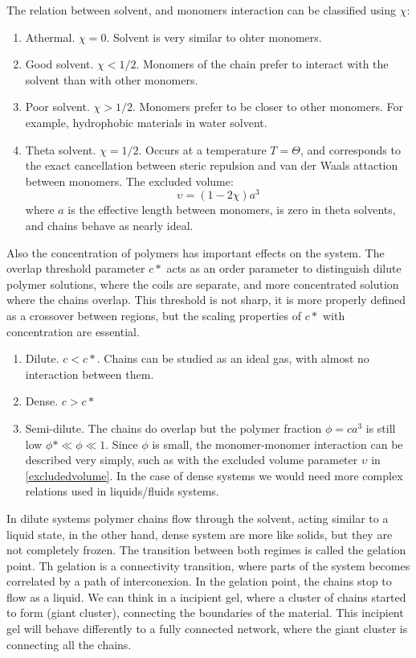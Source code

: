 The relation between solvent, and monomers interaction can be classified using
$\chi$:
\begin{enumerate}
  \item Athermal. $\chi=0$. Solvent is very similar to ohter monomers.
  \item Good solvent. $\chi<1/2$. Monomers of the chain prefer to interact with
  the solvent than with other monomers.
  \item Poor solvent. $\chi>1/2$. Monomers prefer to be closer to other
  monomers. For example, hydrophobic materials in water solvent.
  \item Theta solvent. $\chi=1/2$. Occurs at a temperature $T=\Theta$, and
  corresponds to the exact cancellation between steric repulsion and van der
  Waals attaction between monomers. The excluded volume:
  \begin{equation}\label{excludedvolume}
  \upsilon=(1-2\chi)a^3
  \end{equation}
  where $a$ is the effective length between monomers, is zero in theta solvents,
  and chains behave as nearly ideal.\citep{gennes_scaling_1979}
\end{enumerate}

Also the concentration of polymers has important effects on the system. The
overlap threshold parameter $c*$ acts as an order parameter to distinguish dilute
polymer solutions, where the coils are separate, and more concentrated solution
where the chains overlap. This threshold is not sharp, it is more properly
defined as a crossover between regions, but the scaling properties of $c*$ with
concentration are essential.
\begin{enumerate}
  \item Dilute. $c<c*$. Chains can be studied as an ideal gas, with almost no
  interaction between them.
  \item Dense. $c>c*$
  \item Semi-dilute. The chains do overlap but the polymer fraction
  $\phi=ca^3$ is still low $\phi*\ll\phi\ll1$. Since $\phi$ is small, the monomer-monomer interaction can
  be described very simply, such as with the excluded volume parameter
  $\upsilon$ in \ref{excludedvolume}. In the case of dense systems we would need more complex
  relations used in liquids/fluids systems. 
\end{enumerate}


In dilute systems polymer chains flow through
the solvent, acting similar to a liquid state, in the other hand, dense system
are more like solids, but they are not completely frozen. The transition between
both regimes is called the gelation point. Th gelation is a connectivity
transition, where parts of the system becomes correlated by a path of
interconexion. In the gelation point, the chains stop to flow as a liquid. We
can think in a incipient gel, where a cluster of chains started to form (giant cluster), connecting the boundaries of the
material. This incipient gel will behave differently to a fully connected
network, where the giant cluster is connecting all the chains.

